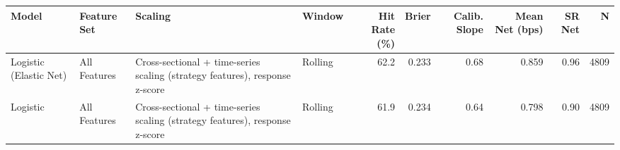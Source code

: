 \begin{tabular}{llllrrrrrr}
\toprule
Model & Feature Set & Scaling & Window & Hit Rate (\%) & Brier & Calib. Slope & Mean Net (bps) & SR Net & N \\
\midrule
Logistic (Elastic Net) & All Features & Cross-sectional + time-series scaling (strategy features), response z-score & Rolling & 62.2 & 0.233 & 0.68 & 0.859 & 0.96 & 4809 \\
Logistic & All Features & Cross-sectional + time-series scaling (strategy features), response z-score & Rolling & 61.9 & 0.234 & 0.64 & 0.798 & 0.90 & 4809 \\
\bottomrule
\end{tabular}
